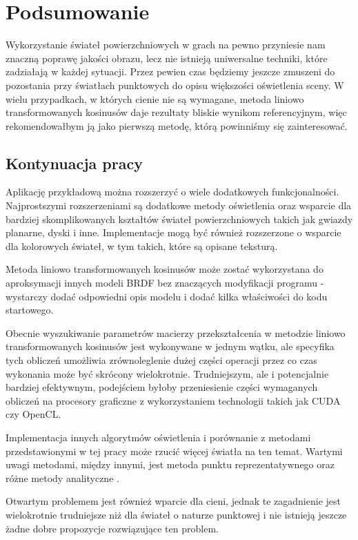 \documentclass[../main.tex]{subfiles}
\begin{document}
\chapter{Podsumowanie}

Wykorzystanie świateł powierzchniowych w grach na pewno przyniesie nam znaczną poprawę jakości obrazu, lecz nie istnieją uniwersalne techniki, które zadziałają w każdej sytuacji. Przez pewien czas będziemy jeszcze zmuszeni do pozostania przy światłach punktowych do opisu większości oświetlenia sceny. W wielu przypadkach, w których cienie nie są wymagane, metoda liniowo transformowanych kosinusów daje rezultaty bliskie wynikom referencyjnym, więc rekomendowałbym ją jako pierwszą metodę, którą powinniśmy się zainteresować.

\section{Kontynuacja pracy}

Aplikację przykładową można rozszerzyć o wiele dodatkowych funkcjonalności. Najprostszymi rozszerzeniami są dodatkowe metody oświetlenia oraz wsparcie dla bardziej skomplikowanych kształtów świateł powierzchniowych takich jak gwiazdy planarne, dyski i inne. Implementacje mogą być również rozszerzone o wsparcie dla kolorowych świateł, w tym takich, które są opisane teksturą.

Metoda liniowo transformowanych kosinusów może zostać wykorzystana do aproksymacji innych modeli BRDF bez znaczących modyfikacji programu - wystarczy dodać odpowiedni opis modelu i dodać kilka właściwości do kodu startowego.

Obecnie wyszukiwanie parametrów macierzy przekształcenia w metodzie liniowo transformowanych kosinusów jest wykonywane w jednym wątku, ale specyfika tych obliczeń umożliwia zrównoleglenie dużej części operacji przez co czas wykonania może być skrócony wielokrotnie. Trudniejszym, ale i potencjalnie bardziej efektywnym, podejściem byłoby przeniesienie części wymaganych obliczeń na procesory graficzne z wykorzystaniem technologii takich jak CUDA czy OpenCL.

Implementacja innych algorytmów oświetlenia i porównanie z metodami przedstawionymi w tej pracy może rzucić więcej światła na ten temat. Wartymi uwagi metodami, między innymi, jest metoda punktu reprezentatywnego \cite{pbr_ue4, Drobot} oraz różne metody analityczne \cite{Snyder, LecoqAnalyticApproximationsForALS}.

Otwartym problemem jest również wparcie dla cieni, jednak te zagadnienie jest wielokrotnie trudniejsze niż dla świateł o naturze punktowej i nie istnieją jeszcze żadne dobre propozycje rozwiązujące ten problem.
\end{document}
